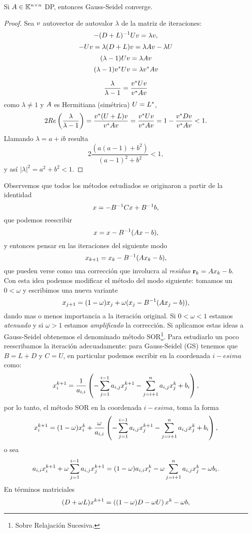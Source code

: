 \tcc
\begin{prop}

 Si $\Ab\in\Knn$  DP, entonces Gauss-Seidel converge.
\end{prop}
\etcc
\begin{proof} Sea $\vb$ autovector de autovalor $\lambda$ de la matriz de iteraciones:
$$
-(\Db+\Lb)^{-1}\Ub\vb=\lambda\vb,
$$
$$
-\Ub\vb=\lambda(\Db+\Lb)\vb=\lambda \Ab \vb-\lambda \Ub
$$
$$
(\lambda-1)\Ub\vb=\lambda \Ab\vb
$$
$$
(\lambda-1)\vb^*\Ub\vb=\lambda \vb^*\Ab\vb
$$

$$
\frac{\lambda}{\lambda-1}=\frac{\vb^*\Ub\vb}{\vb^*\Ab\vb}
$$
como $\lambda\neq 1$ y $\Ab$ es Hermitiana (simétrica) $\Ub=\Lb^*$,
$$
2Re\left(\frac{\lambda}{\lambda-1}\right)=\frac{\vb^*(\Ub+\Lb)\vb}{\vb^*\Ab\vb}=\frac{\vb^*\Ub\vb}{\vb^*\Ab\vb}=1-\frac{\vb^*\Db\vb}{\vb^*\Ab\vb}<1.
$$
Llamando $\lambda=a+ib$ resulta
$$
2\frac{(a(a-1)+b^2)}{(a-1)^2+b^2}<1,
$$
y así
$|\lambda|^2=a^2+b^2<1.$
\end{proof}
Observemos que todos los métodos estudiados se originaron a partir de la identidad
$$
\xb=-\Bb^{-1}\Cb\xb+\Bb^{-1}\bb,
$$
que podemos reescribir
$$
\xb=\xb-\Bb^{-1}(\Ab\xb-\bb),
$$
y entonces pensar en las iteraciones del siguiente modo
$$
\xb_{k+1}=\xb_k-\Bb^{-1}(\Ab\xb_k-\bb),
$$
que pueden verse como una corrección que involucra al \emph{residuo} $\rb_k=\Ab\xb_k-\bb.$ Con esta idea podemos modificar el método del modo siguiente: tomamos un  $0<\omega$ y escribimos una nueva variante
$$
\xb_{j+1}=(1-\omega)\xb_j+
\omega(\xb_j-\Bb^{-1}(\Ab\xb_j-\bb)),
$$
dando mas o menos importancia a la iteración original. Si $0<\omega<1$ estamos \emph{atenuado} y si $\omega>1$ estamos  \emph{amplificado} la corrección. Si aplicamos estas ideas a Gauss-Seidel obtenemos el denominado método SOR\footnote{Sobre Relajación Sucesiva.}. Para estudiarlo un poco reescribamos la iteración adecuadamente:
para Gauss-Seidel (GS) tenemos que $B=L+D$ y $C=U$, en particular podemos escribir en la coordenada $i-esima$ como:
$$
\xb^{k+1}_i=\frac{1}{a_{i,i}}\left(-\sum_{j=1}^{i-1}a_{i,j}\xb_j^{k+1}-\sum_{j=i+1}^{n}a_{i,j}\xb_j^k+\bb_i\right),
$$
por lo tanto, el método SOR
 en la coordenada $i-esima$, toma la forma
$$
\xb^{k+1}_i=(1-\omega)\xb^k_i+
\frac{\omega}{a_{i,i}}\left(-\sum_{j=1}^{i-1}a_{i,j}\xb_j^{k+1}-\sum_{j=i+1}^{n}a_{i,j}\xb_j^k+\bb_i\right),
$$
o sea
$$
a_{i,i}\xb^{k+1}_i+\omega\sum_{j=1}^{i-1}a_{i,j}\xb_j^{k+1}=(1-\omega)a_{i,i}\xb^k_i-
\omega\sum_{j=i+1}^{n}a_{i,j}\xb_j^k -\omega\bb_i.
$$
En términos matriciales
$$
(\Db+\omega \Lb)\xb^{k+1}=\left((1-\omega)\Db-\omega\Ub\right)\xb^{k}-\omega \bb,
$$
